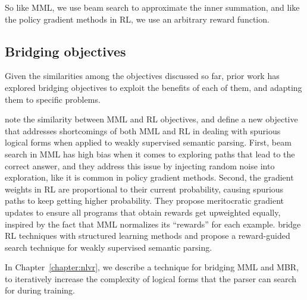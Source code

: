 \noindent So like MML, we use beam search to approximate the inner summation,
and like the policy gradient methods in RL, we use an arbitrary reward function.

\subsection{Bridging objectives}
Given the similarities among the objectives discussed so far, prior work has
explored bridging objectives to exploit the benefits of each
of them, and adapting them to specific problems.

\citet{guu2017bridging} note the
similarity between MML and RL objectives, and define a new objective that
addresses shortcomings of both MML and RL in dealing with spurious logical forms
when applied to weakly supervised semantic parsing. First, beam search in MML
has high bias when it comes to exploring paths that
lead to the correct answer, and they address this issue by injecting random
noise into exploration, like it is common in policy gradient methods. Second,
the gradient weights in RL are proportional to their current probability,
causing spurious paths to keep getting higher probability. They propose
meritocratic gradient updates to ensure all programs that obtain rewards get
upweighted equally, inspired by the fact that MML normalizes its
``rewards'' for each example. \citet{IyyerSQA2016} bridge RL techniques with
structured learning methods and
propose a reward-guided search technique for weakly supervised semantic parsing.

In Chapter~\ref{chapter:nlvr}, we describe a technique for bridging MML and
MBR, to iteratively increase the complexity of logical forms that the parser can
search for during training.
